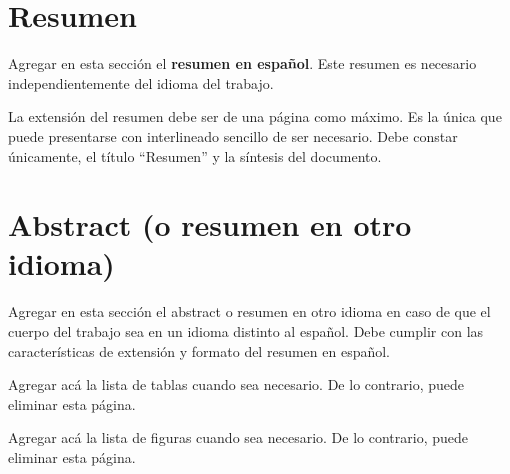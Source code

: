 \documentclass[12pt,oneside]{book}
\theoremstyle{definition}
\begin{document}
\newpage
\thispagestyle{fancy}
\fancyhead{\empty}
\tableofcontents



\newpage
\chapter*{Resumen}

Agregar en esta sección el \textbf{resumen en español}.  Este resumen es necesario independientemente del idioma del trabajo.  

La extensión del resumen debe ser de una página como máximo. Es la única que puede presentarse con interlineado sencillo de ser necesario. Debe constar únicamente, el título “Resumen” y la síntesis del documento.





\newpage
\chapter*{Abstract (o resumen en otro idioma)}

Agregar en esta sección el abstract o resumen en otro idioma en caso de que el cuerpo del trabajo sea en un idioma distinto al español.  Debe cumplir con las características de extensión y formato del resumen en español.




\newpage
{}
\listoftables
Agregar acá la lista de tablas cuando sea necesario.  De lo contrario, puede eliminar esta página.


\newpage
{}
\listoffigures
Agregar acá la lista de figuras cuando sea necesario.  De lo contrario, puede eliminar esta página.





\mainmatter

\pagestyle{fancy}
\fancyhead[r]{\thepage}
\fancyfoot[c]{\empty}
\end{document}
